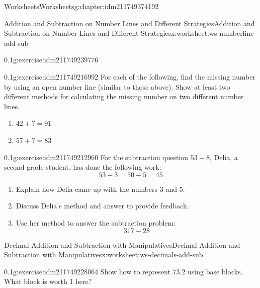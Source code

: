 \documentclass[twoside,11pt,]{book}
\begin{document}
\begin{chapterptx}{Worksheets}{}{Worksheets}{}{}{g:chapter:idm211749374192}
\begin{worksheet-section-numberless}{Addition and Subtraction on Number Lines and Different Strategies}{}{Addition and Subtraction on Number Lines and Different Strategies}{}{}{x:worksheet:ws-numberline-add-sub}
\begin{divisionexercise}{1}{}{0.1}{g:exercise:idm211749239776}
\begin{enumerate}[label=(\alph*)]
\begin{sidebyside}{1}{0.15}{0.15}{0}
\begin{sbspanel}{0.7}
\end{sbspanel}%
\end{sidebyside}%
%
\end{enumerate}
\end{divisionexercise}%
\begin{divisionexercise}{2}{}{0.1}{g:exercise:idm211749216992}%
For each of the following, find the missing number by using an open number line (similar to those above).  Show at least two different methods for calculating the missing number on two different number lines.%
%
\begin{enumerate}[label=(\alph*)]
\item{}\(42+?=91 \)%
\item{}\(57+?=83 \)%
\end{enumerate}
\end{divisionexercise}%
\begin{divisionexercise}{3}{}{0.1}{g:exercise:idm211749212960}%
For the subtraction question \(53-8\), Delia, a second grade student, has done the following work:%
\begin{equation*}
53- 3=50-5=45
\end{equation*}
%
%
\begin{enumerate}[label=(\alph*)]
\item{}Explain how Delia came up with the numbers 3 and 5.%
\item{}Discuss Delia's method and answer to provide feedback.%
\item{}Use her method to answer the subtraction problem:%
\begin{equation*}
317-28
\end{equation*}
%
\end{enumerate}
\end{divisionexercise}%
\end{worksheet-section-numberless}
\restoregeometry
%
%
\typeout{************************************************}
\typeout{************************************************}
%
\begin{worksheet-section-numberless}{Decimal Addition and Subtraction with Manipulatives}{}{Decimal Addition and Subtraction with Manipulatives}{}{}{x:worksheet:ws-decimals-add-sub}
\begin{divisionexercise}{1}{}{0.1}{g:exercise:idm211749228064}%
Show how to represent 73.2 using base blocks.  What block is worth 1 here?%
\end{divisionexercise}%

\end{worksheet-section-numberless}
\end{chapterptx}
\end{document}

